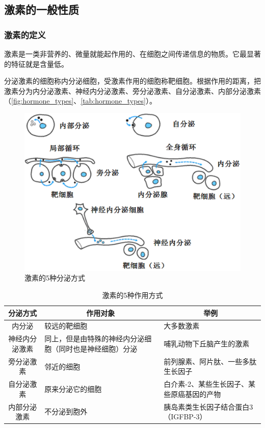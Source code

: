 \subsection{激素的一般性质}

\subsubsection{激素的定义}

激素是一类非营养的、微量就能起作用的、在细胞之间传递信息的物质。它最显著的特征就是含量低。

分泌激素的细胞称内分泌细胞，受激素作用的细胞称靶细胞。根据作用的距离，把激素分为内分泌激素、神经内分泌激素、旁分泌激素、自分泌激素、内部分泌激素（\autoref{fig:hormone_types}、\autoref{tab:hormone_types}）。

\begin{figure}[htbp]
	\centering
	\includegraphics[width=0.7\linewidth]{Pics/激素作用类型}
	\caption{激素的5种分泌方式}
	\label{fig:hormone_types}
\end{figure}

\begin{table}[htbp]
	\centering
	\begin{tabularx}{\textwidth}{|c|X|X|}
		\hline
		\multicolumn{1}{|c|}{分泌方式} & \multicolumn{1}{c|}{作用对象} & \multicolumn{1}{c|}{举例} \\ \hline
		内分泌 & 较远的靶细胞 & 大多数激素 \\ \hline
		神经内分泌激素 & 同上，但是由特殊的神经内分泌细胞（同时也是神经细胞）分泌 & 哺乳动物下丘脑产生的激素 \\ \hline
		旁分泌激素 & 邻近的细胞 & 前列腺素、阿片肽、一些多肽生长因子 \\ \hline
		自分泌激素 & 原来分泌它的细胞 & 白介素-2、某些生长因子、某些原癌基因的产物 \\ \hline
		内部分泌激素 & 不分泌到胞外 & 胰岛素类生长因子结合蛋白3（IGFBP-3） \\ \hline
	\end{tabularx}
	\caption{激素的5种作用方式}
	\label{tab:hormone_types}
\end{table}

